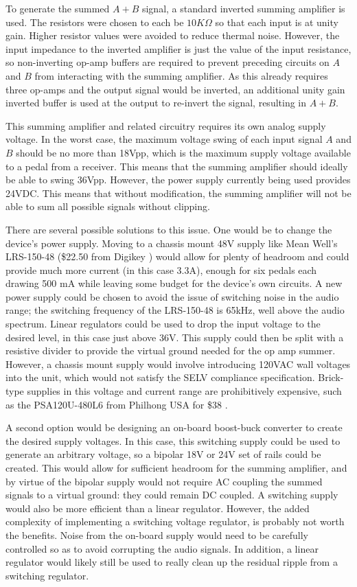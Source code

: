 \documentclass{article}
\begin{document}
	To generate the summed $A+B$ signal, a standard inverted summing amplifier is used.  The resistors were chosen to each be $10K\Omega$ so that each input is at unity gain.  Higher resistor values were avoided to reduce thermal noise.  However, the input impedance to the inverted amplifier is just the value of the input resistance, so non-inverting op-amp buffers are required to prevent preceding circuits on $A$ and $B$ from interacting with the summing amplifier.  As this already requires three op-amps and the output signal would be inverted, an additional unity gain inverted buffer is used at the output to re-invert the signal, resulting in $A+B$.

	This summing amplifier and related circuitry requires its own analog supply voltage.  In the worst case, the maximum voltage swing of each input signal $A$ and $B$ should be no more than 18Vpp, which is the maximum supply voltage available to a pedal from a receiver.  This means that the summing amplifier should ideally be able to swing 36Vpp.  However, the power supply currently being used provides 24VDC.  This means that without modification, the summing amplifier will not be able to sum all possible signals without clipping.

	There are several possible solutions to this issue.  One would be to change the device's power supply.  Moving to a chassis mount 48V supply like Mean Well's LRS-150-48 \cite{datasheet:LRS-150-48} (\$22.50 from Digikey \cite{digikey}) would allow for plenty of headroom and could provide much more current (in this case 3.3A), enough for six pedals each drawing 500 mA while leaving some budget for the device's own circuits.  A new power supply could be chosen to avoid the issue of switching noise in the audio range; the switching frequency of the LRS-150-48 is 65kHz, well above the audio spectrum.  Linear regulators could be used to drop the input voltage to the desired level, in this case just above 36V.  This supply could then be split with a resistive divider to provide the virtual ground needed for the op amp summer.  However, a chassis mount supply would involve introducing 120VAC wall voltages into the unit, which would not satisfy the SELV compliance specification.  Brick-type supplies in this voltage and current range are prohibitively expensive, such as the PSA120U-480L6 from Philhong USA for \$38 \cite{digikey}.

	A second option would be designing an on-board boost-buck converter to create the desired supply voltages.  In this case, this switching supply could be used to generate an arbitrary voltage, so a bipolar 18V or 24V set of rails could be created.  This would allow for sufficient headroom for the summing amplifier, and by virtue of the bipolar supply would not require AC coupling the summed signals to a virtual ground: they could remain DC coupled.  A switching supply would also be more efficient than a linear regulator.  However, the added complexity of implementing a switching voltage regulator, is probably not worth the benefits.  Noise from the on-board supply would need to be carefully controlled so as to avoid corrupting the audio signals.  In addition, a linear regulator would likely still be used to really clean up the residual ripple from a switching regulator.
\end{document}
